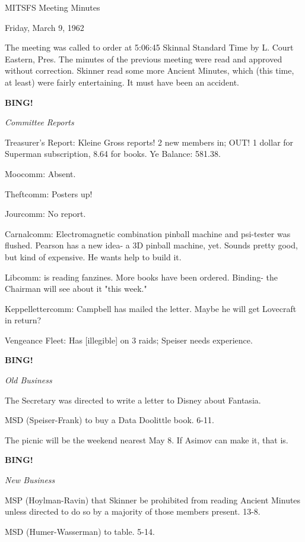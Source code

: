 \documentclass[12pt]{article}
\newcommand{\bing}{{\bf BING!} }
\newcommand{\goto}[1]{\bing \vskip 12pt \centerline{{\em{#1}}}}
\begin{document}
\begin{center}

MITSFS Meeting Minutes

Friday, March 9, 1962

\end{center}
 
\vspace{12pt}

\setlength{\parskip}{6pt}

\noindent
The meeting was called to order at 5:06:45 Skinnal Standard Time by L. Court Eastern, Pres. The minutes of the previous meeting were read and approved without correction. Skinner read some more Ancient Minutes, which (this time, at least) were fairly entertaining. It must have been an accident.

\goto{Committee Reports}

Treasurer's Report: Kleine Gross reports! 2 new members in; OUT! 1 dollar for Superman subscription, 8.64 for books. Ye Balance: 581.38.

Moocomm: Absent.

Theftcomm: Posters up!

Jourcomm: No report.

Carnalcomm: Electromagnetic combination pinball machine and psi-tester was flushed. Pearson has a new idea- a 3D pinball machine, yet. Sounds pretty good, but kind of expensive. He wants help to build it.

Libcomm: is reading fanzines. More books have been ordered. Binding- the Chairman will see about it "this week."

Keppellettercomm: Campbell has mailed the letter. Maybe he will get Lovecraft in return?

Vengeance Fleet: Has [illegible] on 3 raids; Speiser needs experience.

\goto{Old Business}

The Secretary was directed to write a letter to Disney about Fantasia.

MSD (Speiser-Frank) to buy a Data Doolittle book. 6-11.

The picnic will be the weekend nearest May 8. If Asimov can make it, that is.

\goto{New Business}

MSP (Hoylman-Ravin) that Skinner be prohibited from reading Ancient Minutes unless directed to do so by a majority of those members present. 13-8.

MSD (Humer-Wasserman) to table. 5-14.
\end{document}
